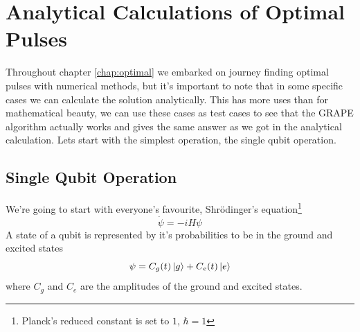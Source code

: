 \documentclass[english, a4paper, 12pt, twoside]{article}
\numberwithin{equation}{section} %
\begin{document}


\newpage
\section{Analytical Calculations of Optimal Pulses} \label{appen:annalytic}
Throughout chapter \ref{chap:optimal} we embarked on journey finding optimal pulses with numerical methods, but it's important to note that in some specific cases we can calculate the solution analytically. This has more uses than for mathematical beauty, we can use these cases as test cases to see that the GRAPE algorithm actually works and gives the same answer as we got in the analytical calculation. Lets start with the simplest operation, the single qubit operation.
\subsection{Single Qubit Operation}
We're going to start with everyone's favourite, Shr\"{o}dinger's equation\footnote{Planck's reduced constant is set to $1$, $\hbar = 1$}
\[
    \dot{\psi} = -i H \psi
\]
A state of a qubit is represented by it's probabilities to be in the ground and excited states
\[
    \psi = C_g(t) \ket{g} + C_e(t) \ket{e}
\]
where $C_g$ and $C_e$ are the amplitudes of the ground and excited states.
\end{document}
